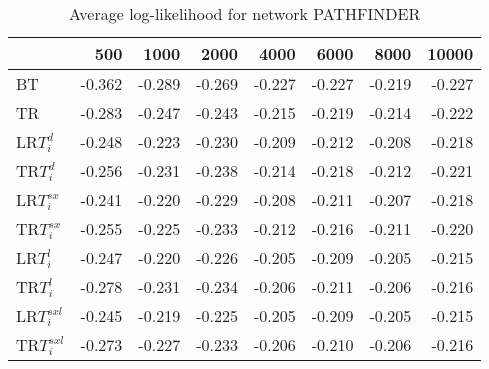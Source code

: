 \begin{table}
 \begin{center}
 \begin{tabular}{lrrrrrrr}
 & 500 & 1000 & 2000 & 4000 & 6000 & 8000 & 10000\\\hline
BT & -0.362 & -0.289 & -0.269 & -0.227 & -0.227 & -0.219 & -0.227\\\hline
TR & -0.283 & -0.247 & -0.243 & -0.215 & -0.219 & -0.214 & -0.222\\\hline
LR$T_i^d$ & -0.248 & -0.223 & -0.230 & -0.209 & -0.212 & -0.208 & -0.218\\\hline
TR$T_i^d$ & -0.256 & -0.231 & -0.238 & -0.214 & -0.218 & -0.212 & -0.221\\\hline
LR$T_i^{sx}$ & -0.241 & -0.220 & -0.229 & -0.208 & -0.211 & -0.207 & -0.218\\\hline
TR$T_i^{sx}$ & -0.255 & -0.225 & -0.233 & -0.212 & -0.216 & -0.211 & -0.220\\\hline
LR$T_i^l$ & -0.247 & -0.220 & -0.226 & -0.205 & -0.209 & -0.205 & -0.215\\\hline
TR$T_i^l$ & -0.278 & -0.231 & -0.234 & -0.206 & -0.211 & -0.206 & -0.216\\\hline
LR$T_i^{sxl}$ & -0.245 & -0.219 & -0.225 & -0.205 & -0.209 & -0.205 & -0.215\\\hline
TR$T_i^{sxl}$ & -0.273 & -0.227 & -0.233 & -0.206 & -0.210 & -0.206 & -0.216\\\hline
\end{tabular}
\end{center}
\caption{Average log-likelihood for network PATHFINDER }
\label{Pathfinderll}
\end{table}


